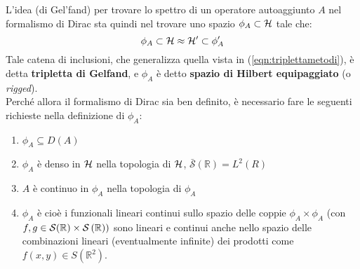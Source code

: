 \documentclass[../../FisicaTeorica.tex]{subfiles}
\begin{document}
L'idea (di Gel'fand) per trovare lo spettro di un operatore autoaggiunto $A$ nel formalismo di Dirac sta quindi nel trovare uno spazio $\phi_A \subset \mathcal{H}$ tale che:
\begin{equation}
\phi_A \subset \mathcal{H} \approx \mathcal{H}' \subset \phi_A'
\label{tripletta-gelfand}
\end{equation}
Tale catena di inclusioni, che generalizza quella vista in (\ref{eqn:triplettametodi}), è detta \textbf{tripletta di Gelfand}, e $\phi_A$ è detto \textbf{spazio di Hilbert equipaggiato} (o \textit{rigged}).\\
Perché allora il formalismo di Dirac sia ben definito, è necessario fare le seguenti richieste nella definizione di $\phi_A$:
\begin{enumerate}
    \item $\displaystyle \phi_A\subseteq D\left(A\right)$
	\item $\phi_A$ è denso in $\mathcal{H}$ nella topologia di $\mathcal{H}$, $\bar{\mathcal{S}}\left(\mathbb{R}\right)=L^2(R)$
	\item $A$ è continuo in $\phi_A$ nella topologia di $\phi_A$
	\item $\phi_A$ è  cioè i funzionali lineari continui sullo spazio delle coppie $\phi_A\times \phi_A$ (con $f,g\in \mathcal{S}(\mathbb{R})\times \mathcal{S}\left(\mathbb{R}\right))$ sono lineari e continui anche nello spazio delle combinazioni lineari (eventualmente infinite) dei prodotti come $f\left(x,y\right)\in S\left(\mathbb{R}^2\right)$.\\
	

\end{enumerate}
\end{document}
